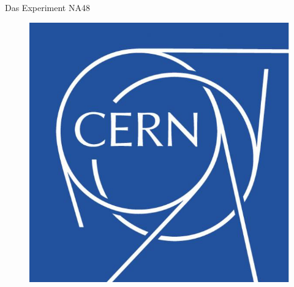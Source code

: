 \documentclass[aspectratio=1610, professionalfonts, 9pt, t]{beamer}
\begin{document}
  \begin{frame}{Das Experiment NA48}
    \begin{figure}
      \includegraphics[height=0.8\textheight]{Images/ripcern.png}
    \end{figure}
  \end{frame}
\end{document}
